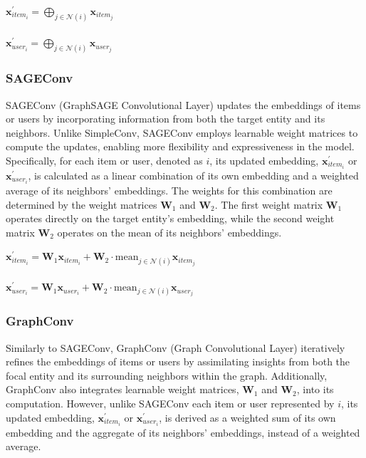 \documentclass{scrartcl}
\begin{document}
\begin{center}
    $\mathbf{x}^{\prime}_{item_{i}} = \bigoplus_{j \in \mathcal{N}(i)} \mathbf{x}_{item_{j}}$ \\~\\
    $\mathbf{x}^{\prime}_{user_{i}} = \bigoplus_{j \in \mathcal{N}(i)} \mathbf{x}_{user_{j}}$
\end{center}

\subsubsection{SAGEConv\cite{sageconv}} 

\quad SAGEConv (GraphSAGE Convolutional Layer) updates the embeddings of items or users by incorporating information from both the target entity and its neighbors. Unlike SimpleConv, SAGEConv employs learnable weight matrices to compute the updates, enabling more flexibility and expressiveness in the model. Specifically, for each item or user, denoted as $i$, its updated embedding, $\mathbf{x}^{\prime}_{item_i}$ or $\mathbf{x}^{\prime}_{user_i}$, is calculated as a linear combination of its own embedding and a weighted average of its neighbors' embeddings. The weights for this combination are determined by the weight matrices $\mathbf{W}_1$ and $\mathbf{W}_2$. The first weight matrix $\mathbf{W}_1$ operates directly on the target entity's embedding, while the second weight matrix $\mathbf{W}_2$ operates on the mean of its neighbors' embeddings. \\ 

\begin{center}
    $\mathbf{x}^{\prime}_{item_{i}} = \mathbf{W}_1 \mathbf{x}_{item_{i}} + \mathbf{W}_2 \cdot \mathrm{mean}_{j \in \mathcal{N}(i)} \mathbf{x}_{item_{j}}$ \\~\\
    $\mathbf{x}^{\prime}_{user_{i}} = \mathbf{W}_1 \mathbf{x}_{user_{i}} + \mathbf{W}_2 \cdot \mathrm{mean}_{j \in \mathcal{N}(i)} \mathbf{x}_{user_{j}}$
\end{center}

\subsubsection{GraphConv\cite{graphconv}} 

\quad Similarly to SAGEConv, GraphConv (Graph Convolutional Layer) iteratively refines the embeddings of items or users by assimilating insights from both the focal entity and its surrounding neighbors within the graph. Additionally, GraphConv also integrates learnable weight matrices, $\mathbf{W}_1$ and $\mathbf{W}_2$, into its computation. However, unlike SAGEConv each item or user represented by $i$, its updated embedding, $\mathbf{x}^{\prime}_{item_i}$ or $\mathbf{x}^{\prime}_{user_i}$, is derived as a weighted sum of its own embedding and the aggregate of its neighbors' embeddings, instead of a weighted average. \\ 
\end{document}
